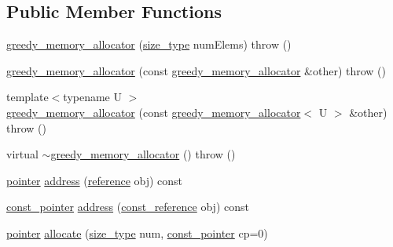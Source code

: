 \subsection*{Public Member Functions}
\begin{DoxyCompactItemize}
\item 
\hyperlink{classuva_1_1utils_1_1containers_1_1alloc_1_1greedy__memory__allocator_a961e7c834ac397d2e453e96f48d59f24}{greedy\+\_\+memory\+\_\+allocator} (\hyperlink{classuva_1_1utils_1_1containers_1_1alloc_1_1greedy__memory__allocator_ab568409292e278990b1df650cebee6ec}{size\+\_\+type} num\+Elems)  throw ()
\item 
\hyperlink{classuva_1_1utils_1_1containers_1_1alloc_1_1greedy__memory__allocator_ae056c4f00623b1f4e7ac43a0810f95ab}{greedy\+\_\+memory\+\_\+allocator} (const \hyperlink{classuva_1_1utils_1_1containers_1_1alloc_1_1greedy__memory__allocator}{greedy\+\_\+memory\+\_\+allocator} \&other)  throw ()
\item 
{\footnotesize template$<$typename U $>$ }\\\hyperlink{classuva_1_1utils_1_1containers_1_1alloc_1_1greedy__memory__allocator_aa3cae2e48a88002f2b85874e4d3ceb7b}{greedy\+\_\+memory\+\_\+allocator} (const \hyperlink{classuva_1_1utils_1_1containers_1_1alloc_1_1greedy__memory__allocator}{greedy\+\_\+memory\+\_\+allocator}$<$ U $>$ \&other)  throw ()
\item 
virtual \hyperlink{classuva_1_1utils_1_1containers_1_1alloc_1_1greedy__memory__allocator_a683bab0fa350543727afdd7acb8d1d14}{$\sim$greedy\+\_\+memory\+\_\+allocator} ()  throw ()
\item 
\hyperlink{classuva_1_1utils_1_1containers_1_1alloc_1_1greedy__memory__allocator_a94dedfba2d38dbe2bec50f6eb95b98eb}{pointer} \hyperlink{classuva_1_1utils_1_1containers_1_1alloc_1_1greedy__memory__allocator_ac54af33aede188723109f27963991e8a}{address} (\hyperlink{classuva_1_1utils_1_1containers_1_1alloc_1_1greedy__memory__allocator_a4dd90bdc76e5190311eb25acb6bb71a9}{reference} obj) const 
\item 
\hyperlink{classuva_1_1utils_1_1containers_1_1alloc_1_1greedy__memory__allocator_afa247377962d665cc91b5d761cb923c4}{const\+\_\+pointer} \hyperlink{classuva_1_1utils_1_1containers_1_1alloc_1_1greedy__memory__allocator_abd53c62a9fce9094addda9cd92bfaca9}{address} (\hyperlink{classuva_1_1utils_1_1containers_1_1alloc_1_1greedy__memory__allocator_aaff0778ffef1cc6b18f8135ec663fe14}{const\+\_\+reference} obj) const 
\item 
\hyperlink{classuva_1_1utils_1_1containers_1_1alloc_1_1greedy__memory__allocator_a94dedfba2d38dbe2bec50f6eb95b98eb}{pointer} \hyperlink{classuva_1_1utils_1_1containers_1_1alloc_1_1greedy__memory__allocator_a01f57a20a63189c0ffd5a3459f49bc00}{allocate} (\hyperlink{classuva_1_1utils_1_1containers_1_1alloc_1_1greedy__memory__allocator_ab568409292e278990b1df650cebee6ec}{size\+\_\+type} num, \hyperlink{classuva_1_1utils_1_1containers_1_1alloc_1_1greedy__memory__allocator_afa247377962d665cc91b5d761cb923c4}{const\+\_\+pointer} cp=0)

\end{DoxyCompactItemize}
